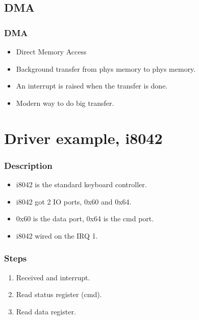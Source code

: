 \subsection{DMA}
\begin{frame}
\frametitle{DMA}
        \begin{itemize}
        \item Direct Memory Access
        \item Background transfer from phys memory to phys memory.
        \item An interrupt is raised when the transfer is done.
        \item Modern way to do big transfer.
        \end{itemize}
\end{frame}

\begin{frame}
\begin{center}
\begin{overlayarea}{10cm}{10cm}
\end{overlayarea}
\end{center}
\end{frame}

\section{Driver example, i8042}

\begin{frame}
\frametitle{Description}
\begin{itemize}
\item i8042 is the standard keyboard controller.
\item i8042 got 2 IO ports, 0x60 and 0x64.
\item 0x60 is the data port, 0x64 is the cmd port.
\item i8042 wired on the IRQ 1.
\end{itemize}
\end{frame}

\begin{frame}
\frametitle{Steps}
\begin{enumerate}
\item Received and interrupt.
\item Read status register (cmd).
\item Read data register.
\end{enumerate}
\end{frame}

